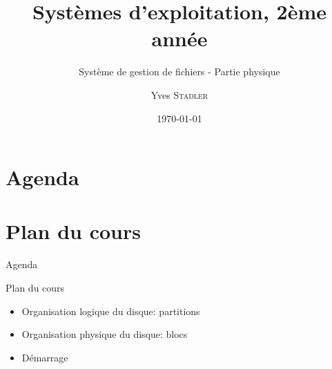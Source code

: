 
\title{Systèmes d'exploitation, 2ème année}
\subtitle{Système de gestion de fichiers - Partie physique}

\author{Yves \textsc{Stadler}}

\date{\today}




\begin{frame}
\titlepage
\end{frame}

\def\sectitle{Agenda}
\section{\sectitle}
\def\subsectitle{Plan du cours}
\section{\subsectitle}

\begin{frame}{\sectitle}
\begin{block}{\subsectitle}
\begin{itemize}
\item Organisation logique du disque: partitions
\item Organisation physique du disque: blocs
\item Démarrage
\end{itemize}
\end{block}
\end{frame}


\def\sectitle{Organisation du disque}
